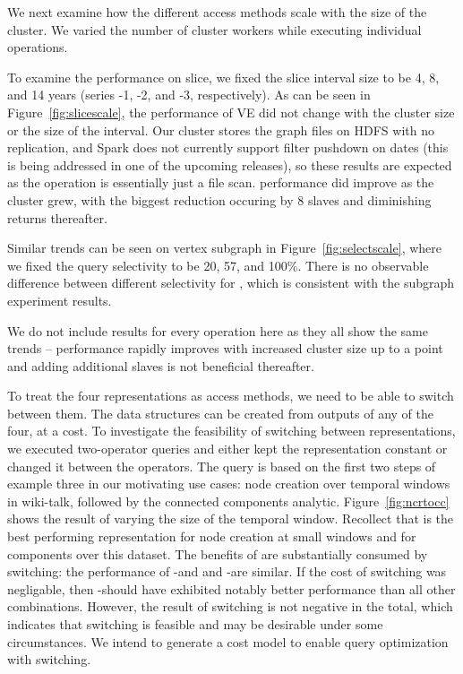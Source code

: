 We next examine how the different access methods scale with the size
of the cluster.  We varied the number of cluster workers while
executing individual operations.

To examine the performance on slice, we fixed the slice interval size
to be 4, 8, and 14 years (series -1, -2, and -3, respectively).  As
can be seen in Figure~\ref{fig:slicescale}, the performance of VE did
not change with the cluster size or the size of the interval.  Our
cluster stores the graph files on HDFS with no replication, and Spark
does not currently support filter pushdown on dates (this is being
addressed in one of the upcoming releases), so these results are
expected as the operation is essentially just a file scan.  \rg
performance did improve as the cluster grew, with the biggest
reduction occuring by 8 slaves and diminishing returns thereafter. 

Similar trends can be seen on vertex subgraph in
Figure~\ref{fig:selectscale}, where we fixed the query selectivity to
be 20, 57, and 100\%.  There is no observable difference between
different selectivity for \rg, which is consistent with the subgraph
experiment results.

We do not include results for every operation here as they all show
the same trends -- performance rapidly improves with increased cluster
size up to a point and adding additional slaves is not beneficial
thereafter.  


To treat the four representations as access methods, we need to be
able to switch between them.  The data structures can be created from
outputs of any of the four, at a cost.  To investigate the feasibility
of switching between representations, we executed two-operator queries
and either kept the representation constant or changed it between the
operators.  The query is based on the first two steps of example three
in our motivating use cases: node creation over temporal windows in
wiki-talk, followed by the connected components analytic.
Figure~\ref{fig:ncrtocc} shows the result of varying the size of the
temporal window.  Recollect that \og is the best performing
representation for node creation at small windows and \hg for
components over this dataset.  The benefits of \hg are substantially
consumed by switching: the performance of \og-\og and and \og-\hg are
similar.  If the cost of switching was negligable, then \og-\hg should
have exhibited notably better performance than all other combinations.
However, the result of switching is not negative in the total, which
indicates that switching is feasible and may be desirable under some
circumstances.  We intend to generate a cost model to enable query
optimization with switching.

